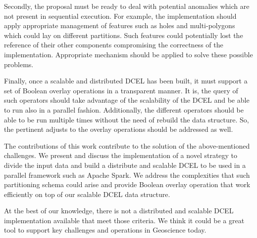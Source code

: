 Secondly, the proposal must be ready to deal with potential anomalies which are not present in sequential execution.  For example, the implementation should apply appropriate management of features such as holes and multi-polygons which could lay on different partitions.  Such features could potentially lost the reference of their other components compromising the correctness of the implementation.  Appropriate mechanism should be applied to solve these possible problems.

Finally, once a scalable and distributed DCEL has been built, it must support a set of Boolean overlay operations in a transparent manner.  It is, the query of such operators should take advantage of the scalability of the DCEL and be able to run also in a parallel fashion.  Additionally, the different operators should be able to be run multiple times without the need of rebuild the data structure.  So, the pertinent adjusts to the overlay operations should be addressed as well.

The contributions of this work contribute to the solution of the above-mentioned challenges.  We present and discuss the implementation of a novel strategy to divide the input data and build a distribute and scalable DCEL to be used in a parallel framework such as Apache Spark.  We address the complexities that such partitioning schema could arise and provide Boolean overlay operation that work efficiently on top of our scalable DCEL data structure.

At the best of our knowledge, there is not a distributed and scalable DCEL implementation available that meet those criteria.  We think it could be a great tool to support key  challenges and operations in Geoscience today.